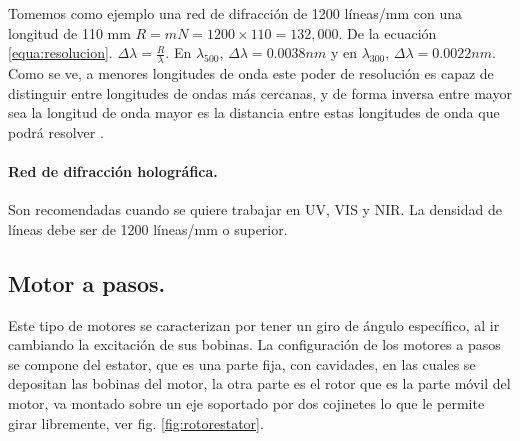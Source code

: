Tomemos como ejemplo una red de difracción de 1200 líneas/mm con una longitud de 110 mm $R=mN = 1200 \times 110 = 132,000$. De la ecuación \ref{equa:resolucion}. $\Delta\lambda = \frac{R}{\lambda}$. En $\lambda_{500}$, $\Delta\lambda = 0.0038nm$
y en $\lambda_{300}$, $\Delta\lambda = 0.0022nm$. Como se ve, a menores longitudes de onda este poder de resolución es capaz de distinguir entre longitudes de ondas más cercanas, y de forma inversa entre mayor sea la longitud de onda mayor es la distancia entre estas longitudes de onda que podrá resolver \cite{Gratings2008}.

\paragraph{Red de difracción holográfica.} Son recomendadas cuando se quiere trabajar en UV, VIS y NIR. La densidad de líneas debe ser de 1200 líneas/mm o superior. %





\subsection{Motor a pasos.}
Este tipo de motores se caracterizan por tener un giro de ángulo específico, al ir cambiando la excitación de sus bobinas. %
La configuración de los motores a pasos se compone del estator, que es una parte fija, con cavidades, en las cuales se depositan las bobinas del motor, la otra parte es el rotor que es la parte móvil del motor, va montado sobre un eje soportado por dos cojinetes lo que le permite girar libremente, ver fig. \ref{fig:rotorestator}. 

